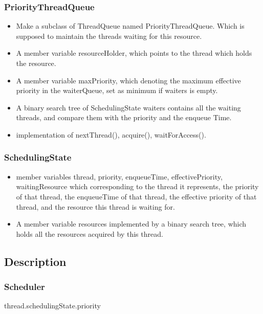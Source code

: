 \documentclass{article}
\begin{document}
	\subsubsection{PriorityThreadQueue}
	
	\begin{itemize}
		\item Make a subclass of ThreadQueue named PriorityThreadQueue. Which is supposed to maintain the threads waiting for this resource.
		
		\item A member variable resourceHolder, which points to the thread which holds the resource.
		
		\item A member variable maxPriority, which denoting the maximum effective priority in the waiterQueue, set as minimum if waiters is empty.
		
		\item A binary search tree of SchedulingState waiters contains all the waiting threads, and compare them with the priority and the enqueue Time.
		
		\item implementation of nextThread(), acquire(), waitForAccess().
	\end{itemize}
	
	\subsubsection{SchedulingState}
	
		\begin{itemize}
			
			\item member variables thread, priority, enqueueTime, effectivePriority, waitingResource which corresponding to the thread it represents, the priority of that thread, the enqueueTime of that thread, the effective priority of that thread, and the resource this thread is waiting for.
			
			\item A member variable resources implemented by a binary search tree, which holds all the resources acquired by this thread.
		\end{itemize}
	
	\subsection{Description}
	\subsubsection{Scheduler}
	\begin{algorithm}[H]
		\begin{algorithmic}
			\State \Return thread.schedulingState.priority
			\EndProcedure
		\end{algorithmic}
	\end{algorithm}
	
\end{document}
